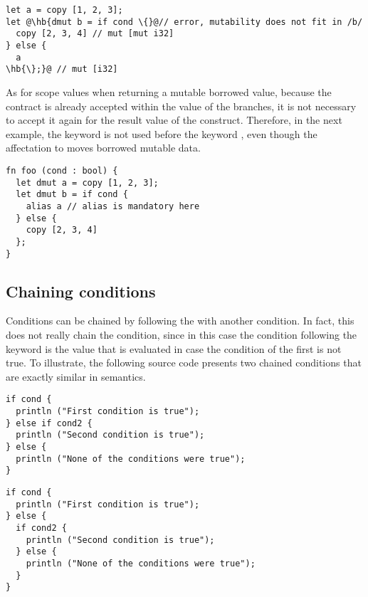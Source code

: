 \begin{lstlisting}[style=coloredverbatim, escapechar=@]
let a = copy [1, 2, 3];
let @\hb{dmut b = if cond \{}@// error, mutability does not fit in /b/
  copy [2, 3, 4] // mut [mut i32]
} else {
  a
\hb{\};}@ // mut [i32]
\end{lstlisting}

As for scope values when returning a mutable borrowed value, because
the  contract is already accepted within the value of the
branches, it is not necessary to accept it again for the result value of the
 construct. Therefore, in the next example, the keyword
 is not used before the keyword , even though the
affectation to  moves borrowed mutable data.

\begin{lstlisting}[style=coloredverbatim, escapechar=@]
fn foo (cond : bool) {
  let dmut a = copy [1, 2, 3];
  let dmut b = if cond {
    alias a // alias is mandatory here
  } else {
    copy [2, 3, 4]
  };
}
\end{lstlisting}


\subsection{Chaining conditions}

Conditions can be chained by following the  with another
 condition. In fact, this does not really chain the condition, since
in this case the  condition following the  keyword is
the value that is evaluated in case the condition of the first  is
not true. To illustrate, the following source code presents two chained
 conditions that are exactly similar in semantics.


\begin{minipage}[t][][t]{0.47\linewidth}
\begin{lstlisting}[style=coloredverbatim, escapechar=@, caption=Using a \token{if} as the value of the \token{else} branch]
if cond {
  println ("First condition is true");
} else if cond2 {
  println ("Second condition is true");
} else {
  println ("None of the conditions were true");
}
\end{lstlisting}
\end{minipage}\hspace{10pt}%
\begin{minipage}[t][][t]{0.47\linewidth}
  \begin{lstlisting}[style=coloredverbatim, escapechar=@, caption=Using a block as the value of the \token{else} branch]
if cond {
  println ("First condition is true");
} else {
  if cond2 {
    println ("Second condition is true");
  } else {
    println ("None of the conditions were true");
  }
}
  \end{lstlisting}
\end{minipage}
\vspace{-10pt}%

